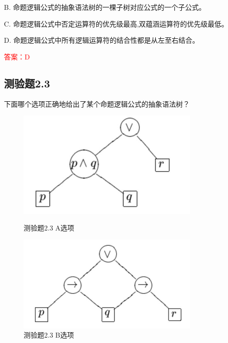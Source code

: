 \documentclass[UTF8, heading=true]{ctexart}
\begin{document}
B. 命题逻辑公式的抽象语法树的一棵子树对应公式的一个子公式。

C. 命题逻辑公式中否定运算符的优先级最高,双蕴涵运算符的优先级最低。

D. 命题逻辑公式中所有逻辑运算符的结合性都是从左至右结合。

\textcolor{red}{答案：D}

\subsection{测验题2.3}

下面哪个选项正确地给出了某个命题逻辑公式的抽象语法树？

\begin{figure}[H]
    \centering
    \begin{minipage}[t]{0.45\textwidth}
        \centering
        \includegraphics[width=0.8\textwidth]{2.3_1.jpg} %
        \caption{测验题2.3 A选项}
    \end{minipage}
    \hfill
    \begin{minipage}[t]{0.45\textwidth}
        \centering
        \includegraphics[width=0.8\textwidth]{2.3_2.jpg} %
        \caption{测验题2.3 B选项}
\end{minipage}
\end{figure}
\end{document}
